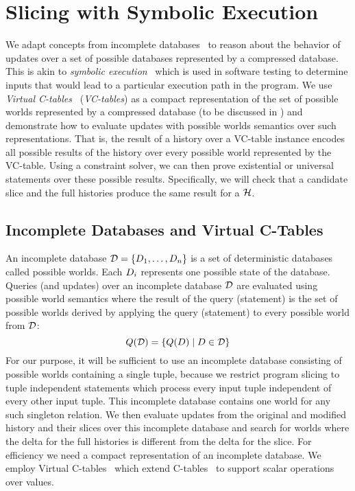 \section{Slicing with Symbolic Execution}
\label{sec:sym-exe}

We adapt concepts from incomplete databases~\cite{IL84a} to reason about the behavior of updates over a set of possible databases represented by a compressed database. This is akin to \textit{symbolic execution}~\cite{cadar13,K76} which is used in software testing to determine inputs that would lead to a particular execution path in the program.
%
We use \textit{Virtual C-tables}~\cite{pip10,lenses15} (\textit{VC-tables}) as a compact representation of the set of possible worlds represented by a compressed database (to be discussed in ) and demonstrate how to evaluate updates with possible worlds semantics over such representations. That is, the result of a history over a VC-table instance encodes all possible results of the history over every possible world represented by the VC-table. Using a constraint solver, we can then prove existential or universal statements over these possible results. Specifically, we will check that a candidate slice and the full histories produce the same result for a \abbrHW $\mathcal{H}$.
\subsection{Incomplete Databases and Virtual C-Tables}
\label{sec:vc-tb}
An incomplete database $\mathcal{D} = \{ D_1, \ldots, D_n \}$ is a set of deterministic databases called possible worlds. Each $D_i$ represents one possible state of the database. Queries (and updates) over an incomplete database $\mathcal{D}$ are evaluated using possible world semantics where the result of the query (statement) is the set of possible worlds derived by applying the query (statement) to every possible world from $\mathcal{D}$: %
%
$$Q(\mathcal{D}) = \{ Q(D) \mid D \in \mathcal{D} \}$$
%
For our purpose, it will be sufficient to use an incomplete database consisting of possible worlds containing a single tuple, because we restrict program slicing to tuple independent statements which process every input tuple independent of every other input tuple.
%
This incomplete database contains one world for any such singleton relation.
We then evaluate updates from the original and modified history and their slices over this incomplete database and search for worlds where the delta for the full histories is different from the delta for the slice.
For efficiency we need a compact representation of an incomplete database. We employ Virtual C-tables~\cite{pip10,lenses15} which extend C-tables~\cite{IL84a} to support scalar operations over values.

